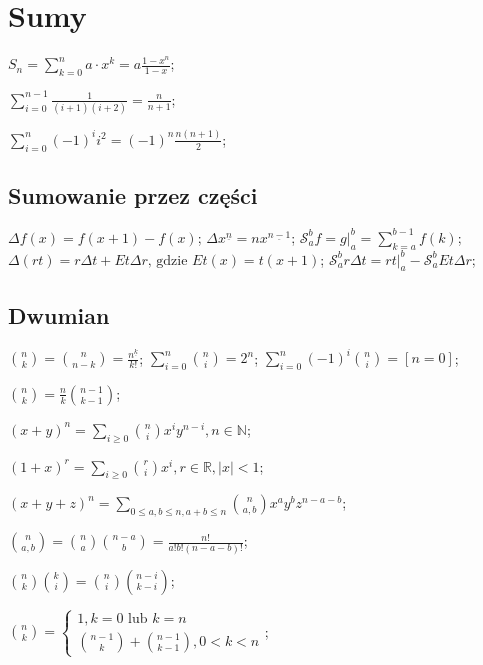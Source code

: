 \section{Sumy}

\entry
${S_n = \sum^{n}_{k = 0} a \cdot x^k} = {a \frac{1 - x^{n}}{1 - x}}$;

\entry
$\sum_{i=0}^{n-1}\frac{1}{(i+1)(i+2)} = \frac{n}{n+1}$;

\entry
$\sum_{i=0}^{n}(-1)^i i^2 = (-1)^n\frac{n(n+1)}{2}$;

\subsection{Sumowanie przez części}

\entry
${\Delta f(x) = f(x + 1) - f(x)}$;
\entry
${\Delta x^{\underline{n}}} = {n x^{\underline{n - 1}}}$;
\entry
${\mathcal{S}^{b}_{a} f}={g |^b_a} = {\sum^{b - 1}_{k = a} f(k)}$;
\entry
${\Delta (rt)} = {r \Delta t + E t \Delta r \text{, gdzie } E t(x)} =
  {t(x + 1)}$;
  \entry
${\mathcal{S}^{b}_{a} r \Delta t}= {r t |^b_a - \mathcal{S}^b_a E t \Delta r}$;

\subsection{Dwumian}

\entry
${\binom{n}{k} = \binom{n}{n - k} = {\frac{n^{\underline{k}}}{k!}}}$;
\entry
${\sum_{i = 0}^n \binom{n}{i} = 2^n}$;
\entry
${\sum_{i = 0}^{n} (-1)^i \binom{n}{i} = [ n = 0 ]}$;

\entry
$\binom{n}{k} = \frac{n}{k} \binom{n - 1}{k - 1}$;

\entry
${(x + y)^n = \sum_{i \geq 0} \binom{n}{i} x^i y^{n-i}, n \in \mathbb{N}}$;

\entry
${(1 + x)^r = \sum_{i \geq 0} \binom{r}{i} x^i, r \in \mathbb{R}, |x| < 1}$;

\entry
$(x + y + z)^n =
  \sum_{0 \leq a, b \leq n, a+b \leq n} \binom{n}{a,b} x^a y^b z^{n-a-b}$;

\entry
$\binom{n}{a,b} = \binom{n}{a}\binom{n-a}{b} = \frac{n!}{a! b! (n - a - b)!}$;

\entry
$\binom{n}{k}\binom{k}{i} = \binom{n}{i}\binom{n-i}{k-i}$;

\entry
$\binom{n}{k} = \begin{cases}
    1, k = 0 \text{ lub } k = n \\
    \binom{n - 1}{k} + \binom{n - 1}{k - 1}, 0 < k < n
\end{cases}
$;


